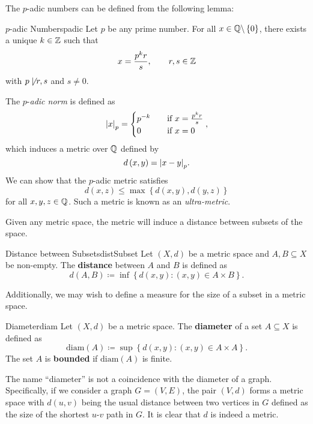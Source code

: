 \documentclass[math, code]{amznotes}
\theoremstyle{remark}
\begin{document}
The $p$-adic numbers can be defined from the following lemma:
\begin{lembox}{$p$-adic Numbers}{padic}
    Let $p$ be any prime number. For all $x \in \mathbb{Q} \backslash \left\{0\right\}$, there exists a unique $k \in \mathbb{Z}$ such that
    \begin{equation*}
        x = \frac{p^kr}{s}, \qquad r, s \in \mathbb{Z}
    \end{equation*}
    with $p \not\mid r, s$ and $s \neq 0$.
\end{lembox}
The $p$-\textit{adic norm} is defined as 
\begin{equation*}
    {\left\lvert {x} \right\rvert}_p = \begin{cases}
        p^{-k} & \quad\textrm{if } x = \frac{p^kr}{s} \\
        0 & \quad\textrm{if } x = 0
    \end{cases},
\end{equation*}
which induces a metric over $\mathbb{Q}$ defined by 
\begin{equation*}
    d\left(x, y\right) ={\left\lvert {x - y} \right\rvert}_p.
\end{equation*}
We can show that the $p$-adic metric satisfies 
\begin{equation*}
    d\left(x, z\right) \leq \max\left\{d\left(x, y\right), d\left(y, z\right)\right\}
\end{equation*}
for all $x, y, z \in \mathbb{Q}$. Such a metric is known as an \textit{ultra-metric}.

Given any metric space, the metric will induce a distance between subsets of the space.
\begin{dfnbox}{Distance between Subsets}{distSubset}
    Let $\left(X, d\right)$ be a metric space and $A, B \subseteq X$ be non-empty. The {\color{red} \textbf{distance}} between $A$ and $B$ is defined as 
    \begin{equation*}
        d\left(A, B\right) \coloneqq \inf \left\{d\left(x, y\right) \colon \left(x, y\right) \in A \times B\right\}.
    \end{equation*}
\end{dfnbox}
Additionally, we may wish to define a measure for the size of a subset in a metric space.
\begin{dfnbox}{Diameter}{diam}
    Let $\left(X, d\right)$ be a metric space. The {\color{red} \textbf{diameter}} of a set $A \subseteq X$ is defined as 
    \begin{equation*}
        \mathrm{diam}\left(A\right) \coloneqq \sup\left\{d\left(x, y\right) \colon \left(x, y\right) \in A \times A\right\}.
    \end{equation*}
    The set $A$ is {\color{red} \textbf{bounded}} if $\mathrm{diam}\left(A\right)$ is finite.
\end{dfnbox}
The name ``diameter'' is not a coincidence with the diameter of a graph. Specifically, if we consider a graph $G = \left(V, E\right)$, the pair $\left(V, d\right)$ forms a metric space with $d\left(u, v\right)$ being the usual distance between two vertices in $G$ defined as the size of the shortest $u$-$v$ path in $G$. It is clear that $d$ is indeed a metric.
\end{document}
